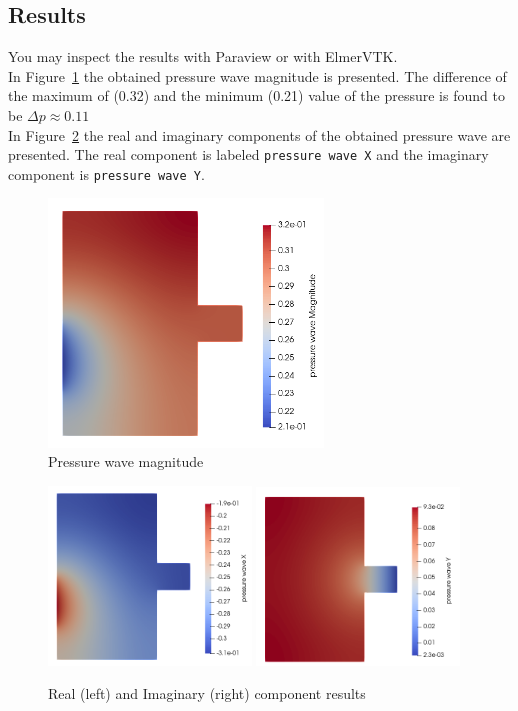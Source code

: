 \subsection*{Results}

You may inspect the results with Paraview or with ElmerVTK.\\

In Figure~\ref{fg:press-mag} the obtained pressure wave magnitude is presented.
 The difference of the maximum of (0.32) and the minimum (0.21) value of the
pressure is found to be $\Delta p \approx 0.11$\\

In Figure~\ref{fg:press-xy} the real and imaginary components of the obtained
pressure wave are presented.  The real component is labeled \texttt{pressure wave X}
and the imaginary component is \texttt{pressure wave Y}.

\begin{figure}[H]
\centering
\includegraphics[width=0.65\textwidth]{press-mag}
\caption{Pressure wave magnitude}\label{fg:press-mag}
\end{figure} 

\begin{figure}[H]
\centering
\includegraphics[width=0.48\textwidth]{press-x}
\includegraphics[width=0.48\textwidth]{press-y}
\caption{Real (left) and Imaginary (right) component results}\label{fg:press-xy}
\end{figure} 


